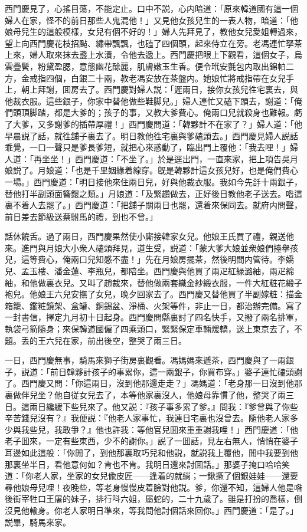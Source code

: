 西門慶見了，心搖目蕩，不能定止。口中不説，心内暗道：「原來韓道國有這一個婦人在家，怪不的前日那些人鬼混他！」又見他女孩兒生的一表人物，暗道：「他娘母兒生的這般模樣，女兒有個不好的！」婦人先拜見了，教他女兒愛姐轉過來，望上向西門慶花枝招颭、繡帶飄飄，也磕了四個頭，起來侍立在旁。老馮連忙拏茶上來，婦人取來抹去盞上水漬，令他去遞上。西門慶把眼上下觀看，這個女子，烏雲疊鬢，粉黛盈腮，意態幽花酴麗，肌膚嫩玉生香。便令玳安氈包内取出錦帕二方，金戒指四個，白銀二十兩，教老馮安放在茶盤内。她娘忙將戒指帶在女兒手上，朝上拜謝，囬房去了。西門慶對婦人説：「遲兩日，接你女孩兒徃宅裏去，與他裁衣服。這些銀子，你家中替他做些鞋脚兒。」婦人連忙又磕下頭去，謝道：「俺們頭頂脚踏，都是大爹的；孩子的事，又教大爹費心。俺兩口兒就殺身也難報。虧了大爹，又多謝爹的插帶厚禮！」西門慶問道：「韓夥計不在家了？」婦人道：「他早晨説了話，就徃舖子裏去了。明日教他徃宅裏與爹磕頭去。」西門慶見婦人説話乖覺，一口一聲只是爹長爹短，就把心來惑動了，臨出門上覆他：「我去哩！」婦人道：「再坐坐！」西門慶道：「不坐了。」於是逕出門，一直來家，把上項告吳月娘説了。月娘道：「也是千里姻緣着線穿。旣是韓夥計這女孩兒好，也是俺們費心一場。」西門慶道：「明日接他來住兩日兒，好與他裁衣服。我如今先㧱十兩銀子，替他打半副頭面簪鐶之類。」月娘道：「及緊趲做去，正好後日教他老子送去。喒這裏不着人去罷了。」西門慶道：「把舖子關兩日也罷，還着來保同去。就府内問聲，前日差去節級送蔡駙馬的禮，到也不曾。」

話休饒舌。過了兩日，西門慶果然使小廝接韓家女兒。他娘王氏買了禮，親送他來。進門與月娘大小衆人磕頭拜見，道生受，説道：「蒙大爹大娘並衆娘們擡擧孩兒，這等費心，俺兩口兒知感不盡！」先在月娘房擺茶，然後明間内管待。李嬌兒、孟玉樓、潘金蓮、李瓶兒，都陪坐。西門慶與他買了兩疋紅緑潞紬，兩疋綿紬，和他做裏衣兒。又叫了趙裁來，替他做兩套織金紗緞衣服，一件大紅粧花緞子袍兒。他娘王六兒安撫了女兒，晚夕回家去了。西門慶又替他買了半副嫁粧：描金箱籠、鑑粧鏡架、盒罐、銅錫盆、淨桶、火架等件，非止一日，都治辦完備。寫了一封書信，擇定九月初十日起身。西門慶問縣裏討了四名快手，又撥了兩名排軍，執袋弓箭隨身；來保韓道國僱了四乘頭口，緊緊保定車輛煖轎，送上東京去了，不題。丢的王六兒在家，前出後空，整哭了兩三日。

一日，西門慶無事，騎馬來獅子街房裏觀看。馮媽媽來遞茶，西門慶與了一兩銀子，説道：「前日韓夥計孩子的事累你，這一兩銀子，你買布穿。」婆子連忙磕頭謝了。西門慶又問：「你這兩日，沒到他那邊走走？」馮媽道：「老身那一日沒到他那裏做伴兒坐？他自従女兒去了，本等他家裏沒人，他娘母靠慣了他，整哭了兩三日。這兩日纔緩下些兒來了。他又説：『孩子事多累了爹。』問我：『爹曾與了你些辛苦錢兒沒有？』我便説：『他老人家事忙，我連日宅裏也沒曾去。隨他老人家多少與我些兒，我敢爭？』他也許我：等他官兒囬來重重謝我哩！」西門慶道：「他老子囬來，一定有些東西，少不的謝你。」説了一囬話，見左右無人，悄悄在婆子耳邊如此這般：「你閒了，到他那裏取巧兒和他説，就説我上覆他，閒中我要到他那裏坐半日，看他意何如？肯也不肯。我明日還來討囬話。」那婆子掩口哈哈笑道：「你老人家，坐家的女兒偸皮匠——逢着的就緔；一鍬撅了個銀娃娃——還要尋他娘母兒哩！夜晚些，等老身慢慢皮着臉對他説。爹，你還不知，這婦人他是喒後街宰牲口王屠的妹子，排行呌六姐，屬蛇的，二十九歲了。雖是打扮的喬樣，倒沒見他輸身。你老人家明日準來，等我問他討個話來回你。」西門慶道：「是了。」説畢，騎馬來家。

